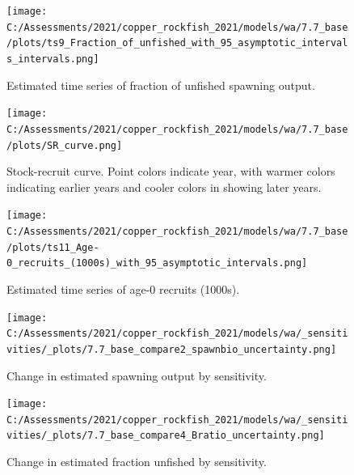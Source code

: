 \documentclass[11pt,
  english,
  a4paper,
]{article}
\begin{document}
\begin{figure}
\centering
\texttt{[image: C:/Assessments/2021/copper\_rockfish\_2021/models/wa/7.7\_base/plots/ts9\_Fraction\_of\_unfished\_with\_95\_asymptotic\_intervals\_intervals.png]}
\caption{Estimated time series of fraction of unfished spawning output.\label{fig:depl}}
\end{figure}

\tagmcend\tagstructend


\begin{figure}
\centering
\texttt{[image: C:/Assessments/2021/copper\_rockfish\_2021/models/wa/7.7\_base/plots/SR\_curve.png]}
\caption{Stock-recruit curve. Point colors indicate year, with warmer colors indicating earlier years and cooler colors in showing later years.\label{fig:bh-curve}}
\end{figure}

\tagmcend\tagstructend


\begin{figure}
\centering
\texttt{[image: C:/Assessments/2021/copper\_rockfish\_2021/models/wa/7.7\_base/plots/ts11\_Age-0\_recruits\_(1000s)\_with\_95\_asymptotic\_intervals.png]}
\caption{Estimated time series of age-0 recruits (1000s).\label{fig:recruits}}
\end{figure}

\tagmcend\tagstructend


\begin{figure}
\centering
\texttt{[image: C:/Assessments/2021/copper\_rockfish\_2021/models/wa/\_sensitivities/\_plots/7.7\_base\_compare2\_spawnbio\_uncertainty.png]}
\caption{Change in estimated spawning output by sensitivity.\label{fig:sens-ssb}}
\end{figure}

\tagmcend\tagstructend


\begin{figure}
\centering
\texttt{[image: C:/Assessments/2021/copper\_rockfish\_2021/models/wa/\_sensitivities/\_plots/7.7\_base\_compare4\_Bratio\_uncertainty.png]}
\caption{Change in estimated fraction unfished by sensitivity.\label{fig:sens-depl}}
\end{figure}
\end{document}
